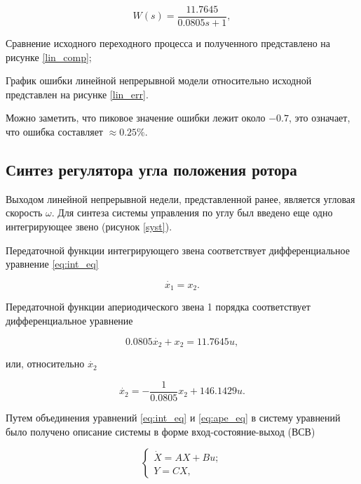 \begin{equation}
  W(s)=\frac{11.7645}{0.0805s+1},
  \label{eq:lin_dbm}
\end{equation}

Сравнение исходного переходного процесса и полученного представлено на рисунке \ref{lin_comp};

\clearpage


График ошибки линейной непрерывной модели относительно исходной представлен на рисунке \ref{lin_err}.


Можно заметить, что пиковое значение ошибки лежит около $-0.7$, это означает, что ошибка составляет
$\approx0.25\%$.

\subsection{Синтез регулятора угла положения ротора}

Выходом линейной непрерывной недели, представленной ранее, является угловая скорость $\omega$.
Для синтеза системы управления по углу был введено еще одно интегрирующее 
звено (рисунок \ref{syst}).


Передаточной функции интегрирующего звена соответствует дифференциальное уравнение \ref{eq:int_eq}

\begin{equation}
  \dot{x_1}=x_2.
  \label{eq:int_eq}
\end{equation}

Передаточной функции апериодического звена 1 порядка соответствует дифференциальное уравнение

$$
  0.0805\dot{x_2} + x_2 = 11.7645u,
$$

или, относительно $\dot{x_2}$

\begin{equation}
  \dot{x_2}=-\frac{1}{0.0805}x_2+146.1429u.
  \label{eq:ape_eq}
\end{equation}

Путем объединения уравнений \ref{eq:int_eq} и \ref{eq:ape_eq} в систему уравнений было получено
описание системы в форме вход-состояние-выход (ВСВ)

$$
  \begin{cases}
    \dot{X}=AX+Bu;
    \\
    Y=CX,
  \end{cases}
$$\\

